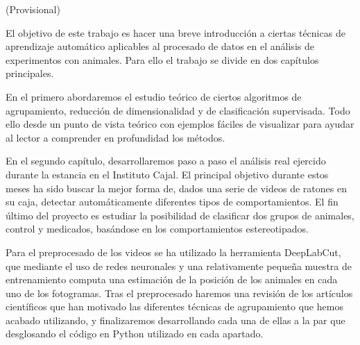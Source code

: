 
(Provisional)

El objetivo de este trabajo es hacer una breve introducción a ciertas técnicas de aprendizaje automático aplicables al procesado de datos en el análisis de experimentos con animales. Para ello el trabajo se divide en dos capítulos principales.

En el primero abordaremos el estudio teórico de ciertos algoritmos de agrupamiento, reducción de dimensionalidad y de clasificación supervisada. Todo ello desde un punto de vista teórico con ejemplos fáciles de visualizar para ayudar al lector a comprender en profundidad los métodos.

En el segundo capítulo, desarrollaremos paso a paso el análisis real ejercido durante la estancia en el Instituto Cajal. El principal objetivo durante estos meses ha sido buscar la mejor forma de, dados una serie de videos de ratones en su caja, detectar automáticamente diferentes tipos de comportamientos. El fin último del proyecto es estudiar la posibilidad de clasificar dos grupos de animales, control y medicados, basándose en los comportamientos estereotipados.

Para el preprocesado de los videos se ha utilizado la herramienta DeepLabCut, que mediante el uso de redes neuronales y una relativamente pequeña muestra de entrenamiento computa una estimación de la posición de los animales en cada uno de los fotogramas. Tras el preprocesado haremos una revisión de los artículos científicos que han motivado las diferentes técnicas de agrupamiento que hemos acabado utilizando, y finalizaremos desarrollando cada una de ellas a la par que desglosando el código en Python utilizado en cada apartado.

